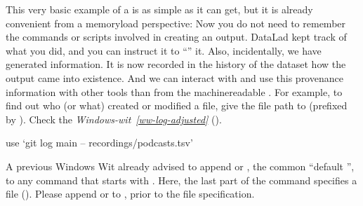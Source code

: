 \sphinxAtStartPar
This very basic example of a  is as simple as it can get, but it
is already
convenient from a memory\sphinxhyphen{}load perspective: Now you do not need to
remember the commands or scripts involved in creating an output. DataLad kept track
of what you did, and you can instruct it to “” it.
Also, incidentally, we have generated {\hyperref[\detokenize{glossary:term-provenance}]{}} information. It is
now recorded in the history of the dataset how the output  came
into existence. And we can interact with and use this provenance information with
other tools than from the machine\sphinxhyphen{}readable .
For example, to find out who (or what) created or modified a file,
give the file path to  (prefixed by \sphinxcode{\sphinxupquote{\sphinxhyphen{}\sphinxhyphen{}}}).
Check the \textit{Windows-wit}~{\windowswiticoninline}\textit{\ref{ww-log-adjusted}} {\hyperref[\detokenize{basics/101-109-rerun:ww-log-adjusted}]{}} ().

\ignorespaces \begin{windowswit}[label={ww-log-adjusted}, before title={\thetcbcounter\ }, float, floatplacement=tb, check odd page=true]{use ‘git log main – recordings/podcasts.tsv’}
\label{\detokenize{basics/101-109-rerun:ww-log-adjusted}}

\sphinxAtStartPar
A previous Windows Wit already advised to append  or , the common “default {\hyperref[\detokenize{glossary:term-branch}]{}}”, to any command that starts with .
Here, the last part of the command specifies a file ().
Please append  or  to , prior to the file specification.


\end{windowswit}

